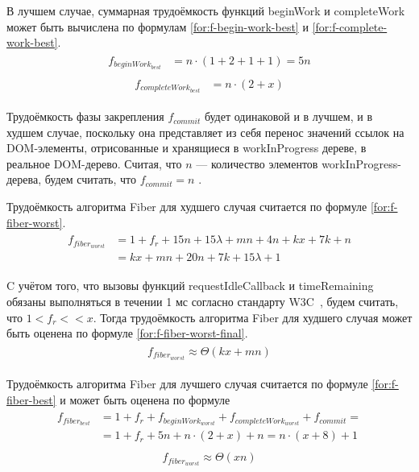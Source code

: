 В лучшем случае, суммарная трудоёмкость функций beginWork и \linebreak completeWork может быть вычислена по формулам \ref{for:f-begin-work-best} и \ref{for:f-complete-work-best}.
\begin{align}
	\begin{split}
		\label{for:f-begin-work-best}
		f_{beginWork_{best}} &= n \cdot (1 + 2 + 1 + 1) = 5n
	\end{split}
\end{align}
\begin{align}
	\begin{split}
		\label{for:f-complete-work-best}
		f_{completeWork_{best}} &= n \cdot(2 + x)
	\end{split}
\end{align}

Трудоёмкость фазы закрепления $f_{commit}$ будет одинаковой и в лучшем, и в худшем случае, поскольку она представляет из себя перенос значений ссылок на DOM-элементы, отрисованные и хранящиеся в workInProgress дереве, в реальное DOM-дерево. Считая, что $n$ --- количество элементов workInProgress-дерева, будем считать, что $f_{commit} = n$ .

Трудоёмкость алгоритма Fiber для худшего случая считается по формуле \ref{for:f-fiber-worst}.
\begin{align}
	\begin{split}
		\label{for:f-fiber-worst}
		f_{fiber_{worst}} &= 1 + f_{r} + 15n + 15\lambda + mn + 4n + kx + 7k + n \\
		&= kx + mn + 20n + 7k + 15\lambda + 1
	\end{split}
\end{align}

C учётом того, что вызовы функций requestIdleCallback и timeRemaining обязаны выполняться в течении 1 мс  согласно стандарту W3C~\cite{requestidlecallback-recommended}, будем считать, что $1 < f_{r} << x$. Тогда трудоёмкость алгоритма Fiber для худшего случая может быть оценена по формуле \ref{for:f-fiber-worst-final}.
\begin{align}
	\begin{split}
		\label{for:f-fiber-worst-final}
		f_{fiber_{worst}} \approx \Theta(kx + mn)
	\end{split}
\end{align}

Трудоёмкость алгоритма Fiber для лучшего случая считается по формуле \ref{for:f-fiber-best} и может быть оценена по формуле 
\begin{align}
	\begin{split}
		\label{for:f-fiber-best}
		f_{fiber_{best}} &= 1 + f_{r} + f_{beginWork_{worst}} + f_{completeWork_{worst}} + f_{commit} =\\
		&= 1  + f_{r} + 5n + n\cdot(2 + x) + n = n  \cdot (x  + 8) + 1
	\end{split}
\end{align}
\begin{align}
	\begin{split}
		\label{for:f-fiber-best-final}
		f_{fiber_{worst}} \approx \Theta(xn)
	\end{split}
\end{align}

